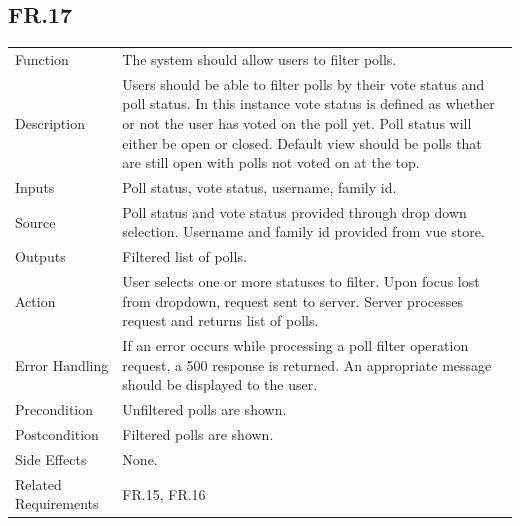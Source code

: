 \documentclass[12pt]{article}
\begin{document}
    \subsection*{FR.17}
    \begin{center}
        \begin{tabular}{| p{10em} p{26em} |}
        \hline
         Function & The system should allow users to filter polls.\\
         Description & Users should be able to filter polls by their vote status and poll status. In this instance vote status is defined as whether or not the user has voted on the poll yet. Poll status will either be open or closed. Default view should be polls that are still open with polls not voted on at the top.\\
         Inputs & Poll status, vote status, username, family id.\\
         Source & Poll status and vote status provided through drop down selection. Username and family id provided from vue store.\\
         Outputs & Filtered list of polls.\\
         Action & User selects one or more statuses to filter. Upon focus lost from dropdown, request sent to server. Server processes request and returns list of polls.\\
         Error Handling & If an error occurs while processing a poll filter operation request, a 500 response is returned. An appropriate message should be displayed to the user.\\
         Precondition & Unfiltered polls are shown.\\
         Postcondition & Filtered polls are shown.\\
         Side Effects & None.\\
         Related Requirements & FR.15, FR.16\\
         \hline
        \end{tabular}
    \end{center}
\end{document}
